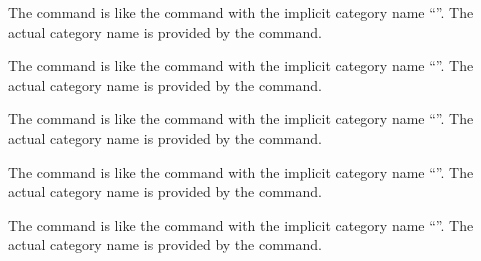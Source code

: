\documentclass{scrartcl}
\begin{document}
{%
\begin{definition}
 
The  command is like the  command with
the implicit category name “”.  The actual category name
is provided by the  command.
\end{definition}

\begin{definition}
 
The  command is like the  command with
the implicit category name “”.  The actual category name
is provided by the  command.
\end{definition}

\begin{definition}
 
The  command is like the  command with
the implicit category name “”.  The actual category name
is provided by the  command.
\end{definition}

\begin{definition}
 
The  command is like the  command with the
implicit category name “”.  The actual category name is
provided by the  command.
\end{definition}

\begin{definition}
 
The  command is like the  command with
the implicit category name “”.  The actual category name
is provided by the  command.
\end{definition}

}
\end{document}
